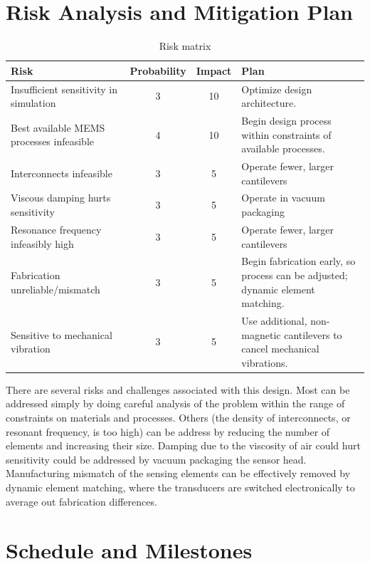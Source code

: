 \section{Risk Analysis and Mitigation Plan}

\begin{table}[h!]
\centering
\begin{tabularx}{.85\textwidth}{|X||c|c|X|}
    \hline
    Risk & Probability & Impact & Plan\\
    \hline
    \hline
    Insufficient sensitivity in simulation & 3 & 10 & Optimize design architecture. \\
    \hline
    Best available MEMS processes infeasible & 4 & 10 & Begin design process within constraints of available processes. \\
    \hline
    Interconnects infeasible & 3 & 5 & Operate fewer, larger cantilevers \\
    \hline
    Viscous damping hurts sensitivity & 3 & 5 & Operate in vacuum packaging \\
    \hline
    Resonance frequency infeasibly high & 3  & 5 & Operate fewer, larger cantilevers \\
    \hline
    Fabrication unreliable/mismatch & 3 & 5 & Begin fabrication early, so process can be adjusted; dynamic element matching. \\
    \hline
    Sensitive to mechanical vibration & 3 & 5 & Use additional, non-magnetic cantilevers to cancel mechanical vibrations. \\
    \hline
\end{tabularx}
\caption{Risk matrix}
\label{table:risk}
\end{table}

There are several risks and challenges associated with this design. Most can be addressed simply by doing careful analysis of the problem within the range of constraints on materials and processes. Others (the density of interconnects, or resonant frequency, is too high) can be address by reducing the number of elements and increasing their size. Damping due to the viscosity of air could hurt sensitivity could be addressed by vacuum packaging the sensor head. Manufacturing mismatch of the sensing elements can be effectively removed by dynamic element matching, where the transducers are switched electronically to average out fabrication differences.

\section{Schedule and Milestones}

